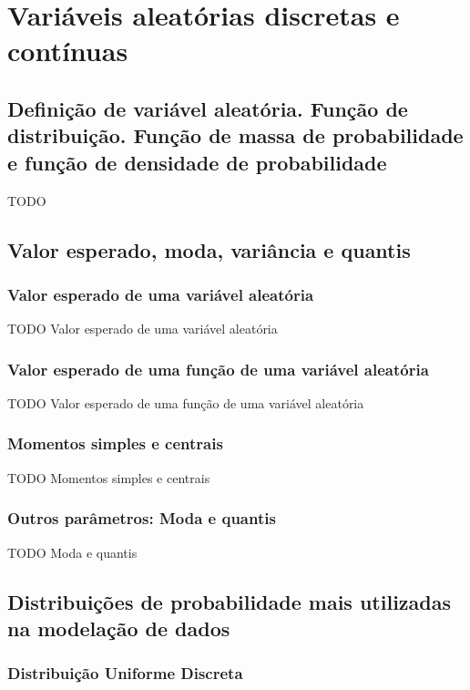 \documentclass[11pt, a4paper]{article}
\begin{document}
\section{Variáveis aleatórias discretas e contínuas}

\subsection{Definição de variável aleatória. Função de distribuição. Função de massa de probabilidade e função de densidade de probabilidade}

TODO

\subsection{Valor esperado, moda, variância e quantis}

\subsubsection*{Valor esperado de uma variável aleatória}

TODO Valor esperado de uma variável aleatória

\subsubsection*{Valor esperado de uma função de uma variável aleatória}

TODO Valor esperado de uma função de uma variável aleatória

\subsubsection*{Momentos simples e centrais}

TODO Momentos simples e centrais

\subsubsection*{Outros parâmetros: Moda e quantis}

TODO Moda e quantis

\subsection{Distribuições de probabilidade mais utilizadas na modelação de dados}

\subsubsection*{Distribuição Uniforme Discreta}
\end{document}
